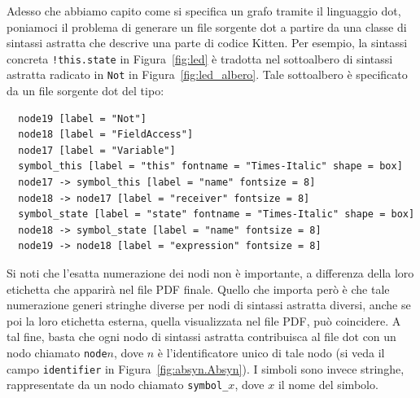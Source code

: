 Adesso che abbiamo capito come si specifica un grafo tramite il linguaggio
dot, poniamoci il problema di generare un file sorgente dot a partire da una
classe di sintassi astratta che descrive una parte di codice Kitten.
Per esempio, la sintassi concreta
\texttt{!this.state} in Figura~\ref{fig:led} \`e tradotta nel sottoalbero
di sintassi astratta radicato in \texttt{Not} in Figura~\ref{fig:led_albero}.
Tale sottoalbero \`e specificato da un file sorgente dot del tipo:
%
\begin{verbatim}
  node19 [label = "Not"]
  node18 [label = "FieldAccess"]
  node17 [label = "Variable"]
  symbol_this [label = "this" fontname = "Times-Italic" shape = box]
  node17 -> symbol_this [label = "name" fontsize = 8]
  node18 -> node17 [label = "receiver" fontsize = 8]
  symbol_state [label = "state" fontname = "Times-Italic" shape = box]
  node18 -> symbol_state [label = "name" fontsize = 8]
  node19 -> node18 [label = "expression" fontsize = 8]
\end{verbatim}
%
Si noti che l'esatta numerazione dei nodi non \`e importante, a differenza
della loro etichetta che apparir\`a nel file PDF finale.
Quello che importa per\`o \`e che tale numerazione generi stringhe diverse
per nodi di sintassi astratta diversi, anche se poi la loro etichetta esterna,
quella visualizzata nel file PDF,
pu\`o coincidere. A tal fine, basta che ogni nodo di sintassi
astratta contribuisca al file dot con un nodo chiamato \texttt{node}$n$,
dove $n$ \`e l'identificatore unico di tale nodo (si veda il campo
\texttt{identifier} in Figura~\ref{fig:absyn.Absyn}). I simboli sono
invece stringhe, rappresentate da un nodo chiamato \texttt{symbol\_}$x$,
dove $x$ \e il nome del simbolo.

